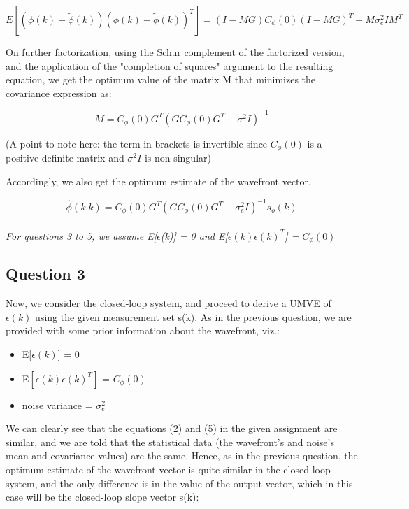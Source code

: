 \documentclass[12pt]{report}
\begin{document}
\begin{equation*}
E\left[\left(\phi(k) - \tilde{\phi}(k)\right)\left(\phi(k) - \tilde{\phi}(k)\right)^{T}\right] = (I - MG)C_{\phi}(0)(I - MG)^{T} + M\sigma_{e}^{2}IM^{T}
\end{equation*}

On further factorization, using the Schur complement of the factorized version, and the application of the "completion of squares" argument to the resulting equation, we get the optimum value of the matrix M that minimizes the covariance expression as:

\begin{equation*}
	M = C_{\phi}(0)G^{T}(GC_{\phi}(0)G^{T} + \sigma^{2}I)^{-1}
\end{equation*}

(A point to note here: the term in brackets is invertible since $C_{\phi}(0)$ is a positive definite matrix and $\sigma^{2}I$ is non-singular)

Accordingly, we also get the optimum estimate of the wavefront vector,

\begin{equation*}
\hat\phi(k|k) = C_{\phi}(0)G^{T}(GC_{\phi}(0)G^{T} + \sigma_{e}^{2}I)^{-1}s_{o}(k)
\end{equation*}

\paragraph*{}
\textit{For questions 3 to 5, we assume E[$\epsilon$(k)] = 0 and E[$\epsilon(k)\epsilon(k)^T$] = $C_{\phi}(0)$}

\subsection*{Question 3}

Now, we consider the closed-loop system, and proceed to derive a UMVE of $\epsilon(k)$ using the given measurement set s(k).
As in the previous question, we are provided with some prior information about the wavefront, viz.:

\begin{itemize}
	\item E[$\epsilon(k)$] = 0
	\item E$\left[\epsilon(k)\epsilon(k)^T\right]$ = $C_{\phi}(0)$
	\item noise variance = $\sigma_{e}^{2}$
\end{itemize}

We can clearly see that the equations (2) and (5) in the given assignment are similar, and we are told that the statistical data (the wavefront's and noise's mean and covariance values) are the same. Hence, as in the previous question, the optimum estimate of the wavefront vector is quite similar in the closed-loop system, and the only difference is in the value of the output vector, which in this case will be the closed-loop slope vector s(k):
\end{document}
